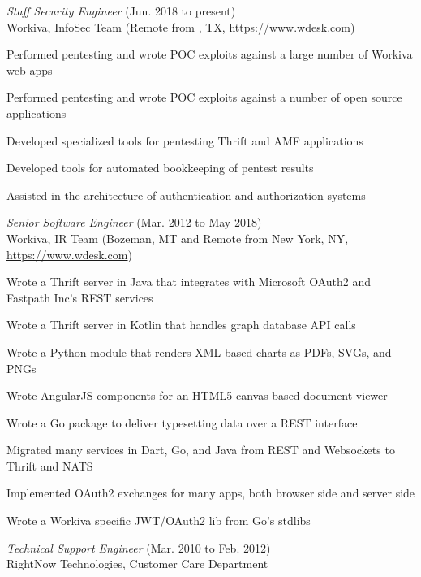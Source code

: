 \documentclass[10pt, a4paper]{article}
\begin{document}
\begin{itemize*}
  \item \emph{Staff Security Engineer} (Jun. 2018 to present)\\
    Workiva, InfoSec Team (Remote from , TX, \url{https://www.wdesk.com})
    \begin{itemize*}
    \item Performed pentesting and wrote POC exploits against a large number of Workiva web apps
    \item Performed pentesting and wrote POC exploits against a number of open source applications
    \item Developed specialized tools for pentesting Thrift and AMF applications
    \item Developed tools for automated bookkeeping of pentest results
    \item Assisted in the architecture of authentication and authorization systems
    \end{itemize*}
  \item \emph{Senior Software Engineer} (Mar. 2012 to May 2018)\\
    Workiva, IR Team (Bozeman, MT and Remote from New York, NY, \url{https://www.wdesk.com})
    \begin{itemize*}
    \item Wrote a Thrift server in Java that integrates with Microsoft OAuth2 and Fastpath Inc's REST services
    \item Wrote a Thrift server in Kotlin that handles graph database API calls
    \item Wrote a Python module that renders XML based charts as PDFs, SVGs, and PNGs
    \item Wrote AngularJS components for an HTML5 canvas based document viewer
    \item Wrote a Go package to deliver typesetting data over a REST interface
    \item Migrated many services in Dart, Go, and Java from REST and Websockets to Thrift and NATS
    \item Implemented OAuth2 exchanges for many apps, both browser side and server side
    \item Wrote a Workiva specific JWT/OAuth2 lib from Go's stdlibs
    \end{itemize*}
  \item \emph{Technical Support Engineer} (Mar. 2010 to Feb. 2012)\\
    RightNow Technologies, Customer Care Department\\

\end{itemize*}
\end{document}
